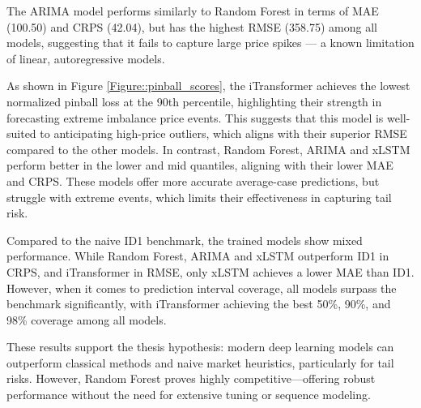 \documentclass[class=scrbook, crop=false]{standalone}
\begin{document}
The ARIMA model performs similarly to Random Forest in terms of MAE (100.50) and CRPS (42.04), but has the highest RMSE (358.75) among all models, suggesting that it fails to capture large price spikes — a known limitation of linear, autoregressive models.

As shown in Figure \ref{Figure::pinball_scores}, the iTransformer achieves the lowest normalized pinball loss at the 90th percentile, highlighting their strength in forecasting extreme imbalance price events. This suggests that this model is well-suited to anticipating high-price outliers, which aligns with their superior RMSE compared to the other models.
In contrast, Random Forest, ARIMA and xLSTM perform better in the lower and mid quantiles, aligning with their lower MAE and CRPS. These models offer more accurate average-case predictions, but struggle with extreme events, which limits their effectiveness in capturing tail risk.

Compared to the naive ID1 benchmark, the trained models show mixed performance. While Random Forest, ARIMA and xLSTM outperform ID1 in CRPS, and iTransformer in RMSE, only xLSTM achieves a lower MAE than ID1.
However, when it comes to prediction interval coverage, all models surpass the benchmark significantly, with iTransformer achieving the best 50\%, 90\%, and 98\% coverage among all models.

These results support the thesis hypothesis: modern deep learning models can outperform classical methods and naive market heuristics, particularly for tail risks. However, Random Forest proves highly competitive—offering robust performance without the need for extensive tuning or sequence modeling.
\end{document}
